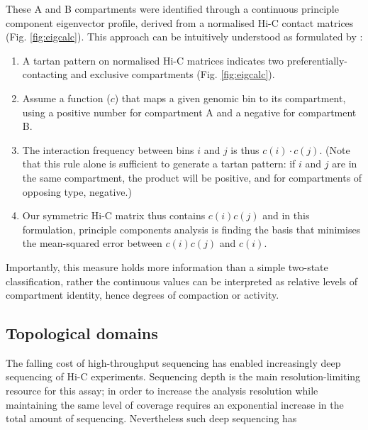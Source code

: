 \documentclass[a4paper,11pt,oneside]{book}
\begin{document}
These A and B  compartments were identified through a continuous principle component eigenvector profile, derived from a normalised Hi-C contact matrices\cite{Lieberman2009} (Fig. \ref{fig:eigcalc}). This approach can be intuitively understood as formulated by \citet{Lajoie2014}:
\begin{enumerate}
\item A tartan pattern on normalised Hi-C matrices indicates two preferentially-contacting and exclusive compartments (Fig. \ref{fig:eigcalc}).
\item Assume a function ($c$) that maps a given genomic bin to its compartment, using a positive number for compartment A and a negative for compartment B.
\item The interaction frequency between bins $i$ and $j$ is thus $c(i)\cdot c(j)$. (Note that this rule alone is sufficient to generate a tartan pattern: if $i$ and $j$ are in the same compartment, the product will be positive, and for compartments of opposing type, negative.\cite{Lajoie2014})
\item Our symmetric Hi-C matrix thus contains $c(i)c(j)$ and in this formulation, principle components analysis is finding the basis that minimises the mean-squared error between $c(i)c(j)$ and $c(i)$.
\end{enumerate}
Importantly, this measure holds more information than a simple two-state classification, rather the continuous values can be interpreted as relative levels of compartment identity, hence degrees of compaction or activity.\cite{Dekker2013, Imakaev2012}

\subsection{Topological domains}\label{intro:tads}

The falling cost of high-throughput sequencing has enabled increasingly deep sequencing of Hi-C experiments. Sequencing depth is the main resolution-limiting resource for this assay; in order to increase the analysis resolution while maintaining the same level of coverage requires an exponential increase in the total amount of sequencing.\cite{Lieberman2009, Tanay2013} Nevertheless such deep sequencing has 
\end{document}
